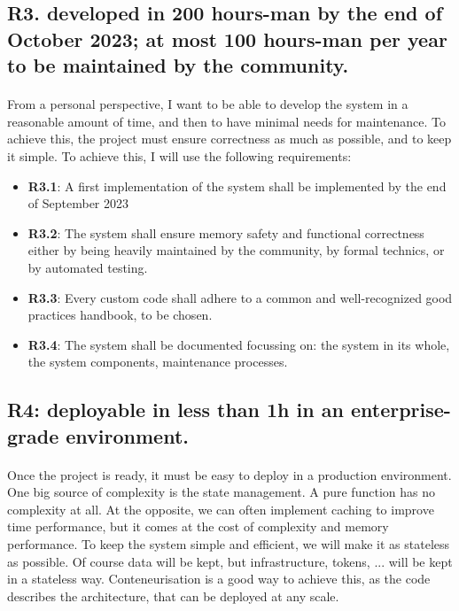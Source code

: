 \subsection{R3. developed in 200 hours-man by the end of October 2023; at most 100 hours-man per year to be maintained by the community. }

\paragraph{}
From a personal perspective, I want to be able to develop the system in a reasonable amount of time, and then to have minimal needs for maintenance. To achieve this, the project must ensure correctness as much as possible, and to keep it simple. To achieve this, I will use the following requirements:

\begin{itemize}  
    \item \textbf{R3.1}: A first implementation of the system shall be implemented by the end of September 2023
    \item \textbf{R3.2}: The system shall ensure memory safety and functional correctness either by being heavily maintained by the community, by formal technics, or by automated testing. 
    \item \textbf{R3.3}: Every custom code shall adhere to a common and well-recognized good practices handbook, to be chosen. 
    \item \textbf{R3.4}: The system shall be documented focussing on: the system in its whole, the system components, maintenance processes. 
\end{itemize}

\subsection{R4: deployable in less than 1h in an enterprise-grade environment.}

\paragraph{}
Once the project is ready, it must be easy to deploy in a production environment. One big source of complexity is the state management. A pure function has no complexity at all. At the opposite, we can often implement caching to improve time performance, but it comes at the cost of complexity and memory performance. To keep the system simple and efficient, we will make it as stateless as possible. Of course data will be kept, but infrastructure, tokens, ... will be kept in a stateless way. Conteneurisation is a good way to achieve this, as the code describes the architecture, that can be deployed at any scale. 

